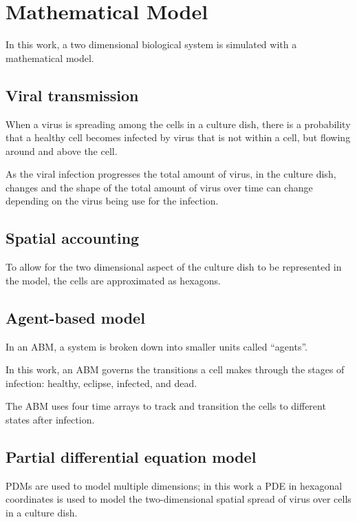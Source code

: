 
\section{Mathematical Model}

In this work, a two dimensional biological system is simulated with a mathematical model. 

\subsection{Viral transmission} \label{Viral_transmission}

When a virus is spreading among the cells in a culture dish, there is a probability that a healthy cell becomes infected by virus that is not within a cell, but flowing around and above the cell. 

As the viral infection progresses the total amount of virus, in the culture dish, changes and the shape of the total amount of virus over time can change depending on the virus being use for the infection. 

\subsection{Spatial accounting} \label{Spatial_accounting}

To allow for the two dimensional aspect of the culture dish to be represented in the model, the cells are approximated as hexagons. 

\subsection{Agent-based model} \label{ABM}

In an ABM, a system is broken down into smaller units called ``agents''. 

In this work, an ABM governs the transitions a cell makes through the stages of infection: healthy, eclipse, infected, and dead. 

The ABM uses four time arrays to track and transition the cells to different states after infection. 

\subsection{Partial differential equation model} \label{PDM}

PDMs are used to model multiple dimensions; in this work a PDE in hexagonal coordinates is used to model the two-dimensional spatial spread of virus over cells in a culture dish. 

